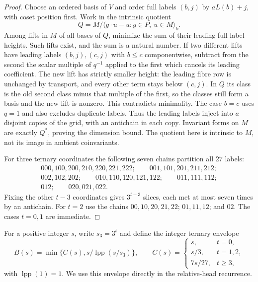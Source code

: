 \begin{proof}
Choose an ordered basis of $V$ and order full labels $(b,j)$ by
$aL(b)+j$, with coset position first. Work in the intrinsic quotient
\[
 Q=M/\langle g\cdot u-u:g\in P,\ u\in M\rangle_k.
\]
Among lifts in $M$ of all bases of $Q$, minimize the sum of their
leading full-label heights. Such lifts exist, and the sum is a natural
number. If two different lifts have leading labels $(b,j),(c,j)$ with
$b\leq c$ componentwise, subtract from the second the scalar multiple
of $q^{-1}$ applied to the first which cancels its leading coefficient.
The new lift has strictly smaller height: the leading fibre row is
unchanged by transport, and every other term stays below $(c,j)$.
In $Q$ its class is the old second class minus that multiple of the
first, so the classes still form a basis and the new lift is nonzero.
This contradicts minimality. The case $b=c$ uses $q=1$ and also
excludes duplicate labels. Thus the leading labels inject into $a$
disjoint copies of the grid, with an antichain in each copy.
Invariant forms on $M$ are exactly $Q^*$, proving the dimension bound.
The quotient here is intrinsic to $M$, not its image in ambient
coinvariants.

For three ternary coordinates the following seven chains partition all
27 labels:
\[
\begin{array}{l}
000,100,200,210,220,221,222;\qquad001,101,201,211,212;\\
002,102,202;\qquad010,110,120,121,122;\qquad011,111,112;\\
012;\qquad020,021,022.
\end{array}
\]
Fixing the other $t-3$ coordinates gives $3^{t-3}$ slices, each met
at most seven times by an antichain. For $t=2$ use the chains
$00,10,20,21,22$; $01,11,12$; and $02$. The cases $t=0,1$ are immediate.
\end{proof}

For a positive integer $s$, write $s_3=3^t$ and define the integer
ternary envelope
\begin{equation}\label{eq:ternary-B}
 B(s)=\min\{C(s),s/\operatorname{lpp}(s/s_3)\},\qquad
 C(s)=\begin{cases}
 s,&t=0,\\
 s/3,&t=1,2,\\
 7s/27,&t\geq3,
 \end{cases}
\end{equation}
with $\operatorname{lpp}(1)=1$. We use this envelope directly in the
relative-head recurrence.


